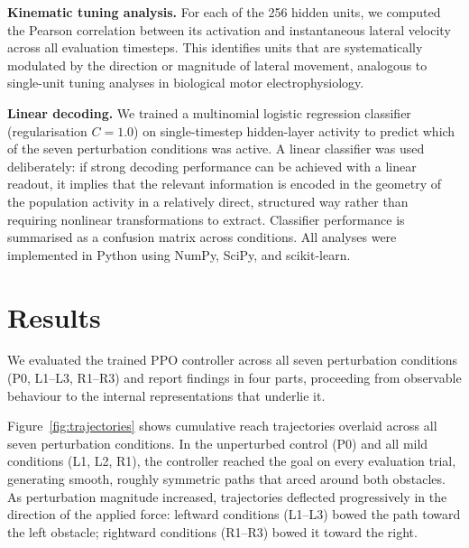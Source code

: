 \documentclass{article}
\begin{document}
\textbf{Kinematic tuning analysis.}
For each of the 256 hidden units, we computed the Pearson correlation
between its activation and instantaneous lateral velocity across all
evaluation timesteps.
This identifies units that are systematically modulated by the direction
or magnitude of lateral movement, analogous to single-unit tuning analyses
in biological motor electrophysiology.

\textbf{Linear decoding.}
We trained a multinomial logistic regression classifier (regularisation
$C = 1.0$) on single-timestep hidden-layer activity to predict which of
the seven perturbation conditions was active.
A linear classifier was used deliberately: if strong decoding performance
can be achieved with a linear readout, it implies that the relevant
information is encoded in the geometry of the population activity in a
relatively direct, structured way rather than requiring nonlinear
transformations to extract.
Classifier performance is summarised as a confusion matrix across
conditions.
All analyses were implemented in Python using NumPy, SciPy, and
scikit-learn.

\section{Results}

We evaluated the trained PPO controller across all seven perturbation
conditions (P0, L1--L3, R1--R3) and report findings in four parts,
proceeding from observable behaviour to the internal representations that
underlie it.

Figure~\ref{fig:trajectories} shows cumulative reach trajectories
overlaid across all seven perturbation conditions.
In the unperturbed control (P0) and all mild conditions (L1, L2, R1),
the controller reached the goal on every evaluation trial, generating
smooth, roughly symmetric paths that arced around both obstacles.
As perturbation magnitude increased, trajectories deflected progressively
in the direction of the applied force: leftward conditions (L1--L3) bowed
the path toward the left obstacle; rightward conditions (R1--R3) bowed it
toward the right.
\end{document}
